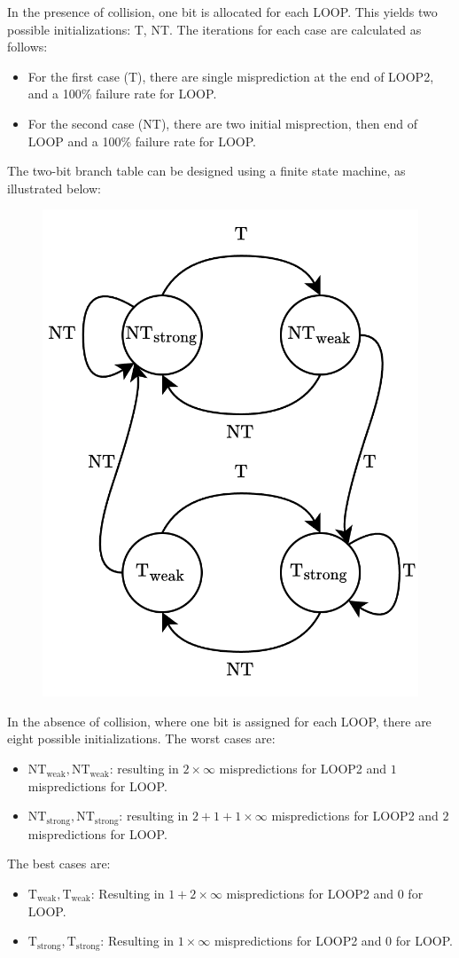 In the presence of collision, one bit is allocated for each LOOP. 
This yields two possible initializations: T, NT.
The iterations for each case are calculated as follows:
\begin{itemize}
    \item For the first case (T), there are  single misprediction at the end of LOOP2, and a 100\% failure rate for LOOP. 
    \item For the second case (NT), there are two initial misprection, then end of LOOP and a 100\% failure rate for LOOP. 
\end{itemize}

The two-bit branch table can be designed using a finite state machine, as illustrated below:
\begin{figure}[H]
    \centering
    \includegraphics[width=0.4\linewidth]{images/2bht.png}
\end{figure}
In the absence of collision, where one bit is assigned for each LOOP, there are eight possible initializations.
The worst cases are:
\begin{itemize}
    \item $\text{NT}_{\text{weak}},\text{NT}_{\text{weak}}$: resulting in $2\times\infty$ mispredictions for LOOP2 and $1$ mispredictions for LOOP.
    \item $\text{NT}_{\text{strong}},\text{NT}_{\text{strong}}$: resulting in $2+1+1\times\infty$ mispredictions for LOOP2 and $2$ mispredictions for LOOP.
\end{itemize}
The best cases are: 
\begin{itemize}
    \item $\text{T}_{\text{weak}},\text{T}_{\text{weak}}$: Resulting in $1 + 2\times\infty$ mispredictions for LOOP2 and $0$ for LOOP.
    \item $\text{T}_{\text{strong}},\text{T}_{\text{strong}}$: Resulting in $1 \times\infty$ mispredictions for LOOP2 and $0$ for LOOP.
\end{itemize}